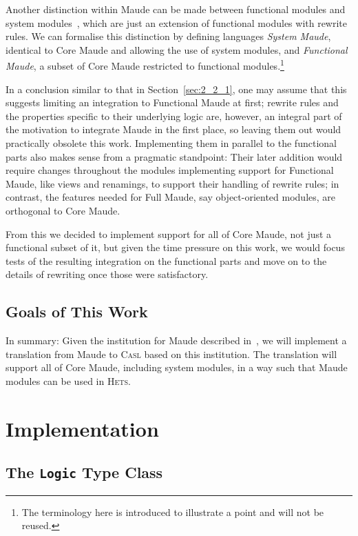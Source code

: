 \documentclass[11pt]{article}
\newcommand{\Casl}{\textsc{Casl}}
\newcommand{\Hets}{\textsc{Hets}}
\begin{document}
Another distinction within Maude can be made between functional modules and system modules~\cite{Clavel:2007}, which are just an extension of functional modules with rewrite rules. We can formalise this distinction by defining languages \emph{System Maude}, identical to Core Maude and allowing the use of system modules, and \emph{Functional Maude}, a subset of Core Maude restricted to functional modules.\footnote{The terminology here is introduced to illustrate a point and will not be reused.}

In a conclusion similar to that in Section~\ref{sec:2_2_1}, one may assume that this suggests limiting an integration to Functional Maude at first; rewrite rules and the properties specific to their underlying logic are, however, an integral part of the motivation to integrate Maude in the first place, so leaving them out would practically obsolete this work. Implementing them in parallel to the functional parts also makes sense from a pragmatic standpoint: Their later addition would require changes throughout the modules implementing support for Functional Maude, like views and renamings, to support their handling of rewrite rules; in contrast, the features needed for Full Maude, say object-oriented modules, are orthogonal to Core Maude.

From this we decided to implement support for all of Core Maude, not just a functional subset of it, but given the time pressure on this work, we would focus tests of the resulting integration on the functional parts and move on to the details of rewriting once those were satisfactory.


\subsection{Goals of This Work}
\label{sec:2_3}

In summary: Given the institution for Maude described in~\cite{Codescu:2010}, we will implement a translation from Maude to \Casl{} based on this institution. The translation will support all of Core Maude, including system modules, in a way such that Maude modules can be used in \Hets{}.


\clearpage
\section{Implementation} %
\label{sec:implementation}

\subsection{The \texttt{Logic} Type Class}
\label{sub:implementation_logic_hets}
\end{document}
